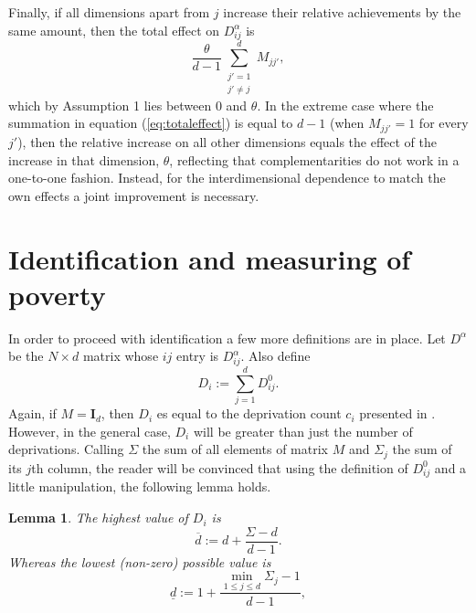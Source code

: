 \documentclass[english, a4paper,12pt]{article}
\newtheorem{lemma}[theorem]{Lemma}
\begin{document}
Finally, if all dimensions apart from $j$ increase their relative achievements by the same amount, then the total effect on $D_{ij}^{\alpha}$ is
	\begin{equation} \label{eq:totaleffect}
		\frac{\theta}{d-1} \sum_{\substack{j' = 1 \\ j' \neq j}}^{d} M_{jj'},
	\end{equation}
which by Assumption 1 lies between 0 and $\theta$. In the extreme case where the summation in equation (\ref{eq:totaleffect}) is equal to $d-1$ (when $M_{jj'} = 1$ for every $j'$), then the relative increase on all other dimensions equals the effect of the increase in that dimension, $\theta$, reflecting that complementarities do not work in a one-to-one fashion. Instead, for the interdimensional dependence to match the own effects a joint improvement is necessary.

\section{Identification and measuring of poverty} \label{sec:identification}
In order to proceed with identification a few more definitions are in place. Let $D^{\alpha}$ be the $N \times d$ matrix whose $ij$ entry is $D_{ij}^{\alpha}$. Also define
	$$D_{i} := \sum_{j=1}^{d} D_{ij}^{0}.$$
Again, if $M = \mathbf{I}_{d}$, then $D_{i}$ es equal to the deprivation count $c_{i}$ presented in \cite{AlkireFoster11}. However, in the general case, $D_{i}$ will be greater than just the number of deprivations. Calling $\Sigma$ the sum of all elements of matrix $M$ and $\Sigma_{j}$ the sum of its $j$th column, the reader will be convinced that using the definition of $D_{ij}^{0}$ and a little manipulation, the following lemma holds.

\begin{lemma} \label{lem:bounds} The highest value of $D_{i}$ is
	\begin{equation} \label{eq:upperbound}
		\overline{d} := d + \frac{\Sigma - d}{d-1}.
	\end{equation}
Whereas the lowest (non-zero) possible value is
	\begin{equation} \label{eq:lowerbound}
		\underline{d} := 1 + \frac{\min_{1 \leq j \leq d} \Sigma_{j} - 1}{d-1},
	\end{equation}
\end{lemma}
\end{document}
